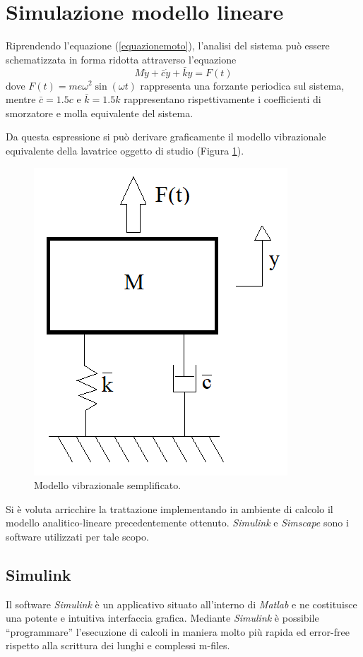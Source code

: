 \section{Simulazione modello lineare}
Riprendendo l'equazione (\ref{equazionemoto}), l'analisi del sistema può essere schematizzata in forma ridotta attraverso l'equazione 
\begin{equation}
    M\ddot y+\bar c\dot y+\bar k y=F(t)
    \label{equazionemodello}
\end{equation}
dove $F(t)=me\omega^2\sin(\omega t)$ rappresenta una forzante periodica sul sistema, mentre  $\bar c=1.5 c$ e $\bar k=1.5 k$ rappresentano rispettivamente i coefficienti di smorzatore e molla equivalente del sistema.

Da questa espressione si può derivare graficamente il modello vibrazionale equivalente della lavatrice oggetto di studio (Figura \ref{ModelloVibrazionale}). 
\begin{figure}[h]
    \centering
    \includegraphics[scale=0.7]{Immagini/Massa-molla-smorzatore.png}
    \caption{Modello vibrazionale semplificato.}
    \label{ModelloVibrazionale}
\end{figure}

Si è voluta arricchire la trattazione implementando in ambiente di calcolo il modello analitico-lineare precedentemente ottenuto. \textit{Simulink} e \textit{Simscape} sono i software utilizzati per tale scopo.
\subsection{Simulink}
 Il  software  \textit{Simulink}  è  un  applicativo  situato all'interno  di \textit{Matlab} e ne costituisce una potente e intuitiva interfaccia grafica. Mediante \textit{Simulink} è possibile “programmare” l'esecuzione di calcoli in maniera molto più rapida ed error-free rispetto alla scrittura dei lunghi e complessi m-files. 
 
